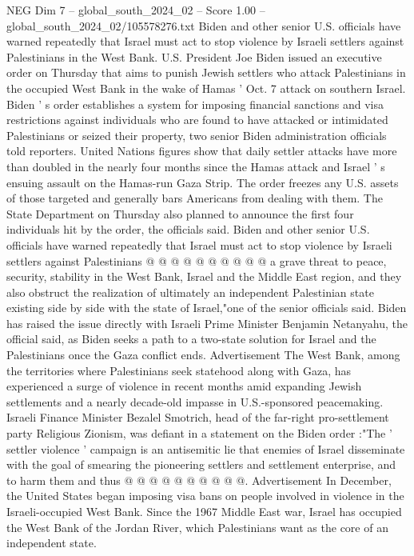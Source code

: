 \begin{textsample}{NEG Dim 7 – global\_south\_2024\_02 – Score 1.00 – global\_south\_2024\_02/105578276.txt}  \label{ex:f7_neg_252}
Biden and other senior U.S. officials have warned repeatedly that Israel must act to stop violence by Israeli settlers against Palestinians in the West Bank.
U.S.
President Joe Biden issued an executive order on Thursday that aims to punish Jewish settlers who attack Palestinians in the occupied West Bank in the wake of Hamas ' Oct. 7 attack on southern Israel.
Biden ' s order establishes a system for imposing financial sanctions and visa restrictions against individuals who are found to have attacked or intimidated Palestinians or seized their property, two senior Biden administration officials told reporters.
United Nations figures show that daily settler attacks have more than doubled in the nearly four months since the Hamas attack and Israel ' s ensuing assault on the Hamas-run Gaza Strip.
The order freezes any U.S. assets of those targeted and generally bars Americans from dealing with them.
The State Department on Thursday also planned to announce the first four individuals hit by the order, the officials said.
Biden and other senior U.S. officials have warned repeatedly that Israel must act to stop violence by Israeli settlers against Palestinians @ @ @ @ @ @ @ @ @ @ a grave threat to peace, security, stability in the West Bank, Israel and the Middle East region, and they also obstruct the realization of ultimately an independent Palestinian state existing side by side with the state of Israel,"one of the senior officials said.
Biden has raised the issue directly with Israeli Prime Minister Benjamin Netanyahu, the official said, as Biden seeks a path to a two-state solution for Israel and the Palestinians once the Gaza conflict ends.
Advertisement The West Bank, among the territories where Palestinians seek statehood along with Gaza, has experienced a surge of violence in recent months amid expanding Jewish settlements and a nearly decade-old impasse in U.S.-sponsored peacemaking.
Israeli Finance Minister Bezalel Smotrich, head of the far-right pro-settlement party Religious Zionism, was defiant in a statement on the Biden order :"The ' settler violence ' campaign is an antisemitic lie that enemies of Israel disseminate with the goal of smearing the pioneering settlers and settlement enterprise, and to harm them and thus @ @ @ @ @ @ @ @ @ @.
Advertisement In December, the United States began imposing visa bans on people involved in violence in the Israeli-occupied West Bank.
Since the 1967 Middle East war, Israel has occupied the West Bank of the Jordan River, which Palestinians want as the core of an independent state.

\end{textsample}
